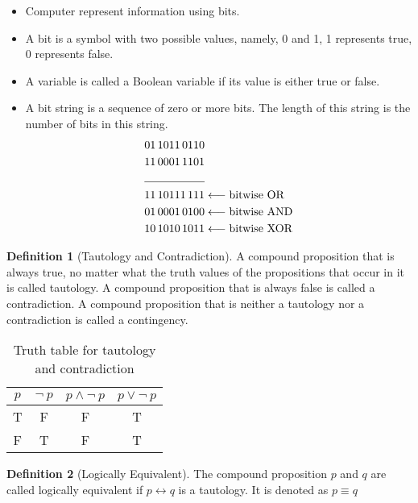 \documentclass[12pt,oneside,a4paper]{book}
\theoremstyle{remark}
\theoremstyle{definition}
\newtheorem{defn}{Definition}
\begin{document}
\begin{itemize}
    \item Computer represent information using bits.
    \item A bit is a symbol with two possible values, namely, 0 and 1, 1 represents true, 0 represents false.
    \item A variable is called a Boolean variable if its value is either true or false.
    \item A bit string is a sequence of zero or more bits. The length of this string is the number of bits in this string.
          \begin{align*}
              01\,1011\,0110   &                                   \\
              11\, 0001 \,1101 &                                   \\\cline{1-1}
              11 \,10111\, 111 & \longleftarrow \text{bitwise OR}  \\
              01 \,0001 \,0100 & \longleftarrow \text{bitwise AND} \\
              10 \,1010\, 1011 & \longleftarrow \text{bitwise XOR}
          \end{align*}
\end{itemize}
\begin{defn}[Tautology and Contradiction]
    A compound proposition that is always true, no matter what the truth values of the propositions that occur in it is called tautology.
    A compound proposition that is always false is called a contradiction.
    A compound proposition that is neither a tautology nor a contradiction is called a contingency.
\end{defn}
\begin{table}[H]
    \centering
    \begin{tabular}{|c|c|c|c|}
        \hline
        $ p $ & \(\neg\ p\) & \(p\wedge \neg\ p\) & \(p\vee\neg\ p\) \\ \hline
        T     & F           & F                   & T                \\ \hline
        F     & T           & F                   & T                \\ \hline
    \end{tabular}
    \caption{Truth table for tautology and contradiction}
\end{table}
\begin{defn}[Logically Equivalent]
    The compound proposition $ p $ and $ q $ are called logically equivalent if \(p\leftrightarrow q\) is a tautology. It is denoted as \(p \equiv q\)
\end{defn}
\end{document}
